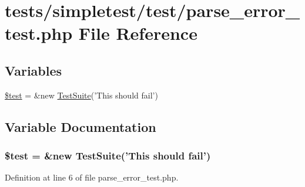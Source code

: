 \hypertarget{parse__error__test_8php}{\section{tests/simpletest/test/parse\-\_\-error\-\_\-test.php File Reference}
\label{parse__error__test_8php}
}
\subsection*{Variables}
\begin{DoxyCompactItemize}
\item 
\hyperlink{parse__error__test_8php_a31daebf88fc668f410293e2c70cea3fc}{\$test} = \&new \hyperlink{class_test_suite}{Test\-Suite}('This should fail')
\end{DoxyCompactItemize}


\subsection{Variable Documentation}
\hypertarget{parse__error__test_8php_a31daebf88fc668f410293e2c70cea3fc}{
\subsubsection[{\$test}]{\setlength{\rightskip}{0pt plus 5cm}\$test = \&new {\bf Test\-Suite}('This should fail')}}\label{parse__error__test_8php_a31daebf88fc668f410293e2c70cea3fc}


Definition at line 6 of file parse\-\_\-error\-\_\-test.\-php.

